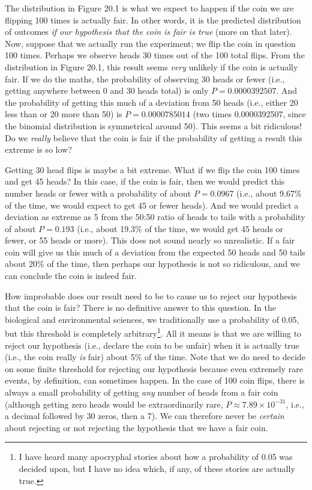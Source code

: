 \documentclass[
]{scrbook}
\begin{document}
The distribution in Figure 20.1 is what we expect to happen if the coin we are flipping 100 times is actually fair.
In other words, it is the predicted distribution of outcomes \emph{if our hypothesis that the coin is fair is true} (more on that later).
Now, suppose that we actually run the experiment; we flip the coin in question 100 times.
Perhaps we observe heads 30 times out of the 100 total flips.
From the distribution in Figure 20.1, this result seems \emph{very} unlikely if the coin is actually fair.
If we do the maths, the probability of observing 30 heads or fewer (i.e., getting anywhere between 0 and 30 heads total) is only \(P = 0.0000392507\).
And the probability of getting this much of a deviation from 50 heads (i.e., either 20 less than or 20 more than 50) is \(P = 0.0000785014\) (two times 0.0000392507, since the binomial distribution is symmetrical around 50).
This seems a bit ridiculous!
Do we \emph{really} believe that the coin is fair if the probability of getting a result this extreme is so low?

Getting 30 head flips is maybe a bit extreme.
What if we flip the coin 100 times and get 45 heads?
In this case, if the coin is fair, then we would predict this number heads or fewer with a probability of about \(P = 0.0967\) (i.e., about 9.67\% of the time, we would expect to get 45 or fewer heads).
And we would predict a deviation as extreme as 5 from the 50:50 ratio of heads to tails with a probability of about \(P = 0.193\) (i.e., about 19.3\% of the time, we would get 45 heads or fewer, or 55 heads or more).
This does not sound nearly so unrealistic.
If a fair coin will give us this much of a deviation from the expected 50 heads and 50 tails about 20\% of the time, then perhaps our hypothesis is not so ridiculous, and we can conclude the coin is indeed fair.

How improbable does our result need to be to cause us to reject our hypothesis that the coin is fair?
There is no definitive answer to this question.
In the biological and environmental sciences, we traditionally use a probability of 0.05, but this threshold is completely arbitrary\footnote{I have heard many apocryphal stories about how a probability of 0.05 was decided upon, but I have no idea which, if any, of these stories are actually true.}.
All it means is that we are willing to reject our hypothesis (i.e., declare the coin to be unfair) when it is actually true (i.e., the coin really \emph{is} fair) about 5\% of the time.
Note that we do need to decide on some finite threshold for rejecting our hypothesis because even extremely rare events, by definition, can sometimes happen.
In the case of 100 coin flips, there is always a small probability of getting \emph{any} number of heads from a fair coin (although getting zero heads would be extraordinarily rare, \(P \approx 7.89 \times 10^{-31}\), i.e., a decimal followed by 30 zeros, then a 7).
We can therefore never be \emph{certain} about rejecting or not rejecting the hypothesis that we have a fair coin.
\end{document}
